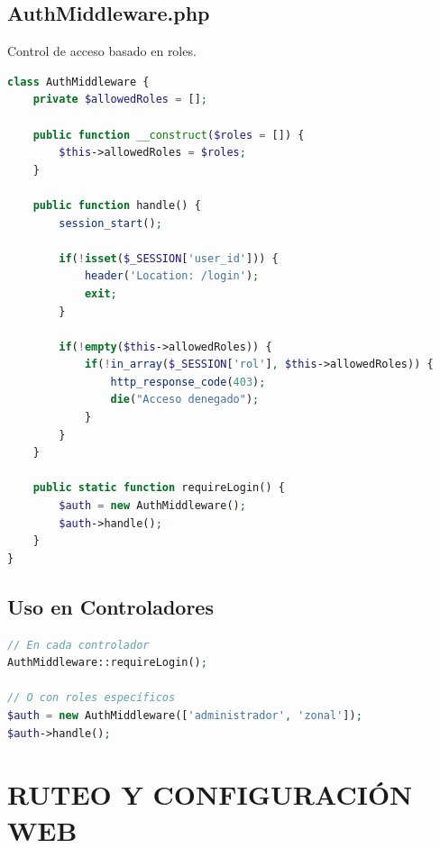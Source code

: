 \documentclass[12pt, a4paper]{report}
\begin{document}
\section{AuthMiddleware.php}
Control de acceso basado en roles.
\begin{lstlisting}[language=PHP, caption=AuthMiddleware.php]
class AuthMiddleware {
    private $allowedRoles = [];
    
    public function __construct($roles = []) {
        $this->allowedRoles = $roles;
    }
    
    public function handle() {
        session_start();
        
        if(!isset($_SESSION['user_id'])) {
            header('Location: /login');
            exit;
        }
        
        if(!empty($this->allowedRoles)) {
            if(!in_array($_SESSION['rol'], $this->allowedRoles)) {
                http_response_code(403);
                die("Acceso denegado");
            }
        }
    }
    
    public static function requireLogin() {
        $auth = new AuthMiddleware();
        $auth->handle();
    }
}
\end{lstlisting}

\section{Uso en Controladores}
\begin{lstlisting}[language=PHP]
// En cada controlador
AuthMiddleware::requireLogin();

// O con roles específicos
$auth = new AuthMiddleware(['administrador', 'zonal']);
$auth->handle();
\end{lstlisting}

\chapter{RUTEO Y CONFIGURACIÓN WEB}
\end{document}

